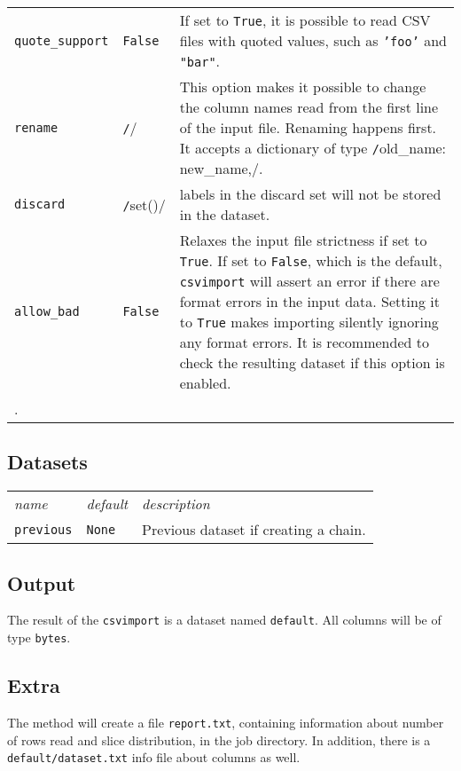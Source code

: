 \begin{tabular}{ p{3.2cm} p{1.8cm} p{10cm}}
  \texttt{quote\_support} & \texttt{False} & If set to \texttt{True},
  it is possible to read CSV files with quoted values, such as
  \texttt{'foo'} and \texttt{"bar"}.\\[1ex]

  \texttt{rename} & \texttt/{}/ & This option makes it possible to
  change the column names read from the first line of the input file.
  Renaming happens first.  It accepts a dictionary of type
  \texttt/{old_name: new_name,}/.\\[1ex]

  \texttt{discard} & \texttt/set()/ & labels in the discard set will
  not be stored in the dataset.\\[1ex]
  
  \texttt{allow\_bad} & \texttt{False} & Relaxes the input file
  strictness if set to \texttt{True}.  If set to \texttt{False}, which
  is the default, \texttt{csvimport} will assert an error if there are
  format errors in the input data.  Setting it to \texttt{True} makes
  importing silently ignoring any format errors.  It is recommended to
  check the resulting dataset if this option is enabled.\\[1ex].
\end{tabular}


\subsection{Datasets}
\begin{tabular}{ p{3.2cm} p{1.8cm} p{10cm}}
  \textsl{name} & \textsl{default} & \textsl{description}\\[2ex]
  \texttt{previous} & \texttt{None} & Previous dataset if creating a
  chain.
\end{tabular}

\subsection{Output}
The result of the \texttt{csvimport} is a dataset named
\texttt{default}.  All columns will be of type \texttt{bytes}.

\subsection{Extra}
The method will create a file \texttt{report.txt}, containing
information about number of rows read and slice distribution, in the
job directory.  In addition, there is a \texttt{default/dataset.txt}
info file about columns as well.






